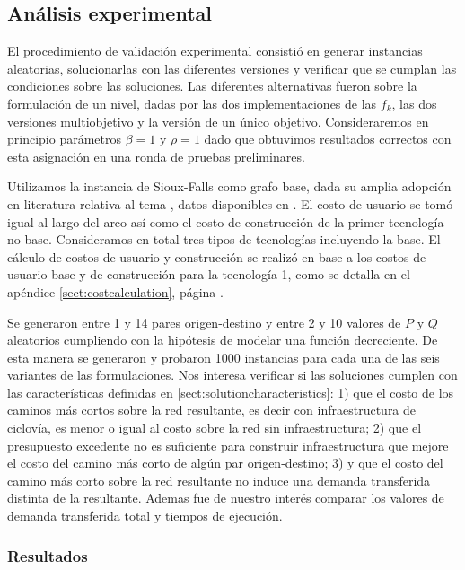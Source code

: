 \documentclass{article}
\begin{document}
  \FloatBarrier
  \subsection{Análisis experimental}

  El procedimiento de validación experimental consistió en generar instancias aleatorias, solucionarlas con las diferentes versiones y verificar que se cumplan las condiciones sobre las soluciones. Las diferentes alternativas fueron sobre la formulación de un nivel, dadas por las dos implementaciones de las $f_k$, las dos versiones multiobjetivo y la versión de un único objetivo. Consideraremos en principio parámetros $\beta = 1$ y $\rho = 1$ dado que obtuvimos resultados correctos con esta asignación en una ronda de pruebas preliminares.

  Utilizamos la instancia de Sioux-Falls como grafo base, dada su amplia adopción en literatura relativa al tema \cite{liu2019}, datos disponibles en \cite{sect:siouxfallsdata}. El costo de usuario se tomó igual al largo del arco así como el costo de construcción de la primer tecnología no base. Consideramos en total tres tipos de tecnologías incluyendo la base. El cálculo de costos de usuario y construcción se realizó en base a los costos de usuario base y de construcción para la tecnología 1, como se detalla en el apéndice \ref{sect:costcalculation}, página \pageref{sect:costcalculation}.

  Se generaron entre 1 y 14 pares origen-destino y entre 2 y 10 valores de $P$ y $Q$ aleatorios cumpliendo con la hipótesis de modelar una función decreciente.
  De esta manera se generaron y probaron 1000 instancias para cada una de las seis variantes de las formulaciones. Nos interesa verificar si las soluciones cumplen con las características definidas en \ref{sect:solutioncharacteristics}: 1) que el costo de los caminos más cortos sobre la red resultante, es decir con infraestructura de ciclovía, es menor o igual al costo sobre la red sin infraestructura; 2) que el presupuesto excedente no es suficiente para construir infraestructura que mejore el costo del camino más corto de algún par origen-destino; 3) y que el costo del camino más corto sobre la red resultante no induce una demanda transferida distinta de la resultante. Ademas fue de nuestro interés comparar los valores de demanda transferida total y tiempos de ejecución.

  \FloatBarrier
  \subsubsection{Resultados}
\end{document}
